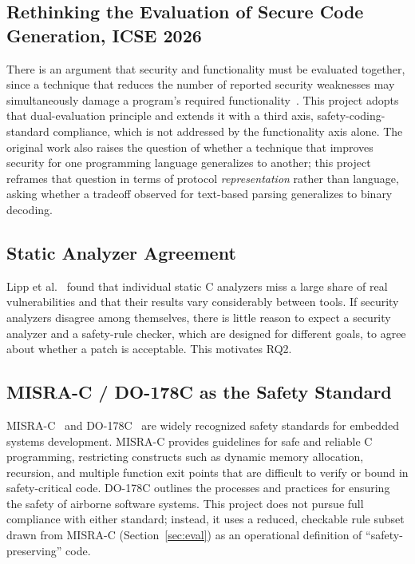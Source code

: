 \documentclass[12pt]{article}
\begin{document}
\subsection{Rethinking the Evaluation of Secure Code Generation, ICSE 2026}
There is an argument that security and functionality must be evaluated together, since a technique that reduces the number of reported security weaknesses may simultaneously damage a program's required functionality~\citep{rethinking2026}. This project adopts that dual-evaluation principle and extends it with a third axis, safety-coding-standard compliance, which is not addressed by the functionality axis alone. The original work also raises the question of whether a technique that improves security for one programming language generalizes to another; this project reframes that question in terms of protocol \emph{representation} rather than language, asking whether a tradeoff observed for text-based parsing generalizes to binary decoding.

\subsection{Static Analyzer Agreement}
Lipp et al.~\citep{lipp2022static} found that individual static C analyzers miss a large share of real vulnerabilities and that their results vary considerably between tools. If security analyzers disagree among themselves, there is little reason to expect a security analyzer and a safety-rule checker, which are designed for different goals, to agree about whether a patch is acceptable. This motivates RQ2.

\subsection{MISRA-C / DO-178C as the Safety Standard}
MISRA-C~\citep{misra2012} and DO-178C~\citep{do178c} are widely recognized safety standards for embedded systems development. MISRA-C provides guidelines for safe and reliable C programming, restricting constructs such as dynamic memory allocation, recursion, and multiple function exit points that are difficult to verify or bound in safety-critical code. DO-178C outlines the processes and practices for ensuring the safety of airborne software systems. This project does not pursue full compliance with either standard; instead, it uses a reduced, checkable rule subset drawn from MISRA-C (Section~\ref{sec:eval}) as an operational definition of ``safety-preserving'' code.
\end{document}
